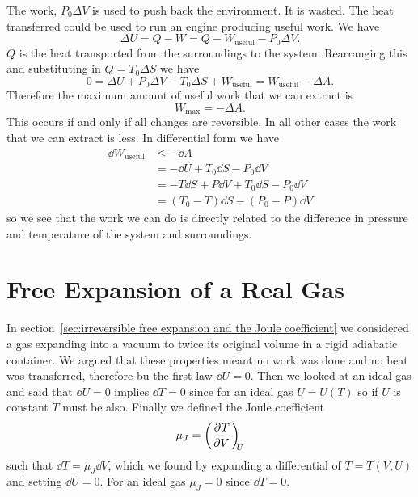     The work, \(P_0\Delta V\) is used to push back the environment.
    It is wasted.
    The heat transferred could be used to run an engine producing useful work.
    We have
    \[\Delta U = Q - W = Q - W_\text{useful} - P_0\Delta V.\]
    \(Q\)  is the heat transported from the surroundings to the system.
    Rearranging this and substituting in \(Q = T_0\Delta S\) we have
    \[0 = \Delta U + P_0\Delta V - T_0\Delta S + W_\text{useful} = W_\text{useful} - \Delta A.\]
    Therefore the maximum amount of useful work that we can extract is 
    \[W_{\max} = -\Delta A.\]
    This occurs if and only if all changes are reversible.
    In all other cases the work that we can extract is less.
    In differential form we have
    \begin{align*}
        \dd{W_\text{useful}} &\le -\dd{A}\\
        &= -\dd{U} + T_0\dd{S} - P_0\dd{V}\\
        &= -T\dd{S} + P\dd{V} + T_0\dd{S} - P_0\dd{V}\\
        &= (T_0 - T)\dd{S} - (P_0 - P)\dd{V}
    \end{align*}
    so we see that the work we can do is directly related to the difference in pressure and temperature of the system and surroundings.
    
    \section{Free Expansion of a Real Gas}
    In section~\ref{sec:irreversible free expansion and the Joule coefficient} we considered a gas expanding into a vacuum to twice its original volume in a rigid adiabatic container.
    We argued that these properties meant no work was done and no heat was transferred, therefore bu the first law \(\dd{U} = 0\).
    Then we looked at an ideal gas and said that \(\dd{U} = 0\) implies \(\dd{T} = 0\) since for an ideal gas \(U = U(T)\) so if \(U\) is constant \(T\) must be also.
    Finally we defined the Joule coefficient
    \[\mu_J = \left(\pdv[]{T}{V}\right)_{\!\!{U}}\]
    such that \(\dd{T} = \mu_J\dd{V}\), which we found by expanding a differential of \(T = T(V, U)\) and setting \(\dd{U} = 0\).
    For an ideal gas \(\mu_J = 0\) since \(\dd{T} = 0\).
    
